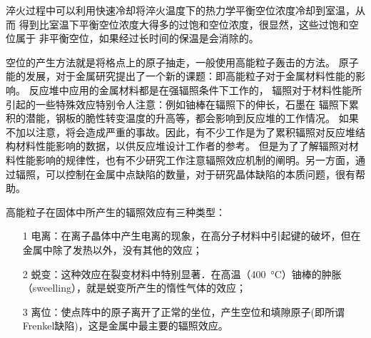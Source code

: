         淬火过程中可以利用快速冷却将淬火温度下的热力学平衡空位浓度冷却到室温，从而
        得到比室温下平衡空位浓度大得多的过饱和空位浓度，很显然，这些过饱和空位属于
        非平衡空位，如果经过长时间的保温是会消除的。

        空位的产生方法就是将格点上的原子抽走，一般使用高能粒子轰击的方法。
        原子能的发展，对于金属研究提出了一个新的课题：即高能粒子对于金属材料性能的影响。
        反应堆中应用的金属材料都是在强辐照条件下工作的，
        辐照对于材料性能所引起的一些特殊效应特别令人注意：例如铀棒在辐照下的伸长，石墨在
        辐照下累积的潜能，钢板的脆性转变温度的升高等，都会影响到反应堆的工作情况。
        如果不加以注意，将会造成严重的事故。因此，有不少工作是为了累积辐照对反应堆结构材料性能影响的数据，以供反应堆设计工作者的参考。 
        但是为了了解辐照对材料性能影响的规律性，也有不少研究工作注意辐照效应机制的阐明。另一方面，通过辐照，可以控制在金属中点缺陷的数量，对于研究晶体缺陷的本质问题，很有帮助。

        高能粒子在固体中所产生的辐照效应有三种类型：
        \begin{itemize}
            \item[1] 电离：在离子晶体中产生电离的现象，在高分子材料中引起键的破坏，但在金属中除了发热以外，没有其他的效应；
            \item[2] 蜕变：这种效应在裂变材料中特别显著．在高温（\SI{400}{\celsius}）铀棒的肿胀（sweelling），就是蜕变所产生的惰性气体的效应；
            \item[3] 离位：使点阵中的原子离开了正常的坐位，产生空位和填隙原子(即所谓Frenkel缺陷)，这是金属中最主要的辐照效应。
        \end{itemize}

